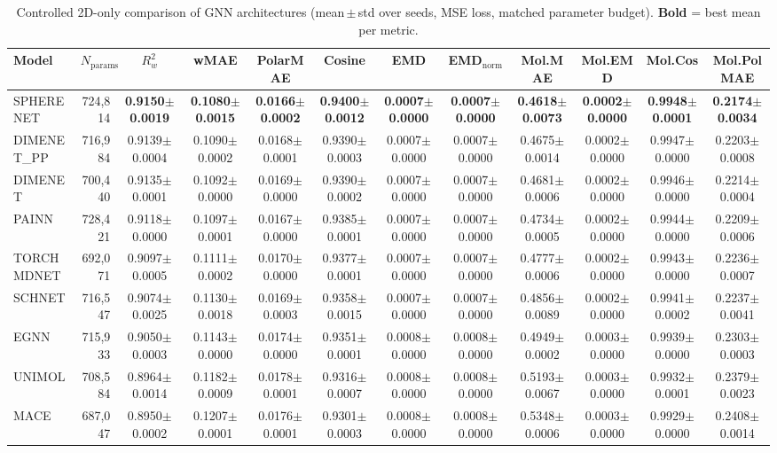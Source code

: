 \begin{table}[ht]
\centering
\caption{Controlled 2D-only comparison of GNN architectures (mean\,$\pm$\,std over seeds, MSE loss, matched parameter budget). \textbf{Bold} = best mean per metric.}
\label{tab:benchmark_2d_mse}
\small
\begin{tabular}{l r c c c c c c c c c c }
\toprule
Model & $N_{\text{params}}$ & $R^2_w$ & wMAE & PolarMAE & Cosine & EMD & EMD$_\mathrm{norm}$ & Mol.MAE & Mol.EMD & Mol.Cos & Mol.PolMAE \\
\midrule
SPHERENET & 724,814 & \textbf{0.9150$\pm$0.0019} & \textbf{0.1080$\pm$0.0015} & \textbf{0.0166$\pm$0.0002} & \textbf{0.9400$\pm$0.0012} & \textbf{0.0007$\pm$0.0000} & \textbf{0.0007$\pm$0.0000} & \textbf{0.4618$\pm$0.0073} & \textbf{0.0002$\pm$0.0000} & \textbf{0.9948$\pm$0.0001} & \textbf{0.2174$\pm$0.0034} \\
DIMENET_PP & 716,984 & 0.9139$\pm$0.0004 & 0.1090$\pm$0.0002 & 0.0168$\pm$0.0001 & 0.9390$\pm$0.0003 & 0.0007$\pm$0.0000 & 0.0007$\pm$0.0000 & 0.4675$\pm$0.0014 & 0.0002$\pm$0.0000 & 0.9947$\pm$0.0000 & 0.2203$\pm$0.0008 \\
DIMENET & 700,440 & 0.9135$\pm$0.0001 & 0.1092$\pm$0.0000 & 0.0169$\pm$0.0000 & 0.9390$\pm$0.0002 & 0.0007$\pm$0.0000 & 0.0007$\pm$0.0000 & 0.4681$\pm$0.0006 & 0.0002$\pm$0.0000 & 0.9946$\pm$0.0000 & 0.2214$\pm$0.0004 \\
PAINN & 728,421 & 0.9118$\pm$0.0000 & 0.1097$\pm$0.0001 & 0.0167$\pm$0.0000 & 0.9385$\pm$0.0001 & 0.0007$\pm$0.0000 & 0.0007$\pm$0.0000 & 0.4734$\pm$0.0005 & 0.0002$\pm$0.0000 & 0.9944$\pm$0.0000 & 0.2209$\pm$0.0006 \\
TORCHMDNET & 692,071 & 0.9097$\pm$0.0005 & 0.1111$\pm$0.0002 & 0.0170$\pm$0.0000 & 0.9377$\pm$0.0001 & 0.0007$\pm$0.0000 & 0.0007$\pm$0.0000 & 0.4777$\pm$0.0006 & 0.0002$\pm$0.0000 & 0.9943$\pm$0.0000 & 0.2236$\pm$0.0007 \\
SCHNET & 716,547 & 0.9074$\pm$0.0025 & 0.1130$\pm$0.0018 & 0.0169$\pm$0.0003 & 0.9358$\pm$0.0015 & 0.0007$\pm$0.0000 & 0.0007$\pm$0.0000 & 0.4856$\pm$0.0089 & 0.0002$\pm$0.0000 & 0.9941$\pm$0.0002 & 0.2237$\pm$0.0041 \\
EGNN & 715,933 & 0.9050$\pm$0.0003 & 0.1143$\pm$0.0000 & 0.0174$\pm$0.0000 & 0.9351$\pm$0.0001 & 0.0008$\pm$0.0000 & 0.0008$\pm$0.0000 & 0.4949$\pm$0.0002 & 0.0003$\pm$0.0000 & 0.9939$\pm$0.0000 & 0.2303$\pm$0.0003 \\
UNIMOL & 708,584 & 0.8964$\pm$0.0014 & 0.1182$\pm$0.0009 & 0.0178$\pm$0.0001 & 0.9316$\pm$0.0007 & 0.0008$\pm$0.0000 & 0.0008$\pm$0.0000 & 0.5193$\pm$0.0067 & 0.0003$\pm$0.0000 & 0.9932$\pm$0.0001 & 0.2379$\pm$0.0023 \\
MACE & 687,047 & 0.8950$\pm$0.0002 & 0.1207$\pm$0.0001 & 0.0176$\pm$0.0001 & 0.9301$\pm$0.0003 & 0.0008$\pm$0.0000 & 0.0008$\pm$0.0000 & 0.5348$\pm$0.0006 & 0.0003$\pm$0.0000 & 0.9929$\pm$0.0000 & 0.2408$\pm$0.0014 \\
\bottomrule
\end{tabular}
\end{table}
